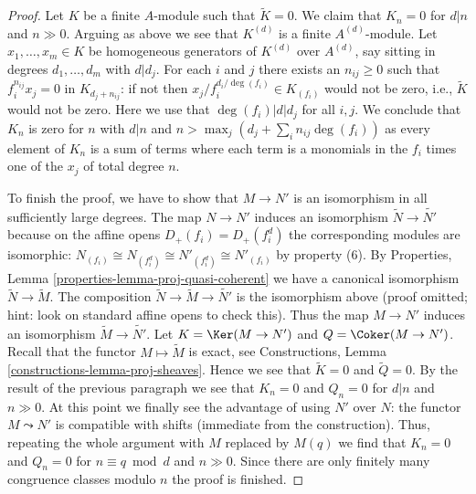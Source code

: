 \begin{proof}
\medskip\noindent
Let $K$ be a finite $A$-module such that $\widetilde{K} = 0$. We claim
that $K_n = 0$ for $d|n$ and $n \gg 0$. Arguing as above we see that
$K^{(d)}$ is a finite $A^{(d)}$-module. Let
$x_1, \ldots, x_m \in K$ be homogeneous generators of $K^{(d)}$
over $A^{(d)}$, say sitting in degrees $d_1, \ldots, d_m$ with $d | d_j$.
For each $i$ and $j$ there exists an $n_{ij} \geq 0$ such that
$f_i^{n_{ij}} x_j = 0$ in $K_{d_j + n_{ij}}$: if not then
$x_j/f_i^{d_i/\deg(f_i)} \in K_{(f_i)}$ would not be zero, i.e.,
$\widetilde{K}$ would not be zero. Here we use that $\deg(f_i) | d | d_j$
for all $i, j$. We conclude that $K_n$ is zero for
$n$ with $d | n$ and $n > \max_j (d_j + \sum_i n_{ij} \deg(f_i))$
as every element of $K_n$ is a sum of terms where each term is a
monomials in the $f_i$ times one of the $x_j$ of total degree $n$.

\medskip\noindent
To finish the proof, we have to show that $M \to N'$ is an isomorphism
in all sufficiently large degrees. The map $N \to N'$ induces an
isomorphism $\widetilde{N} \to \widetilde{N'}$ because on the affine
opens $D_+(f_i) = D_+(f_i^d)$ the corresponding modules are isomorphic:
$N_{(f_i)} \cong N_{(f_i^d)} \cong N'_{(f_i^d)} \cong N'_{(f_i)}$
by property (6).
By Properties, Lemma \ref{properties-lemma-proj-quasi-coherent}
we have a canonical isomorphism $\widetilde{N} \to \widetilde{M}$.
The composition $\widetilde{N} \to \widetilde{M} \to \widetilde{N'}$
is the isomorphism above (proof omitted; hint: look on standard
affine opens to check this). Thus the map $M \to N'$ induces an isomorphism
$\widetilde{M} \to \widetilde{N'}$.
Let $K = \Ker(M \to N')$ and $Q = \Coker(M \to N')$.
Recall that the functor
$M \mapsto \widetilde{M}$ is exact, see
Constructions, Lemma \ref{constructions-lemma-proj-sheaves}.
Hence we see that $\widetilde{K} = 0$ and $\widetilde{Q} = 0$.
By the result of the previous paragraph we see that $K_n = 0$ and
$Q_n = 0$ for $d | n$ and $n \gg 0$. At this point we finally see
the advantage of using $N'$ over $N$: the functor $M \leadsto N'$
is compatible with shifts (immediate from the construction).
Thus, repeating the whole argument with $M$ replaced by $M(q)$
we find that $K_n = 0$ and $Q_n = 0$ for $n \equiv q \bmod d$
and $n \gg 0$. Since there are
only finitely many congruence classes modulo $n$ the proof is finished.
\end{proof}

